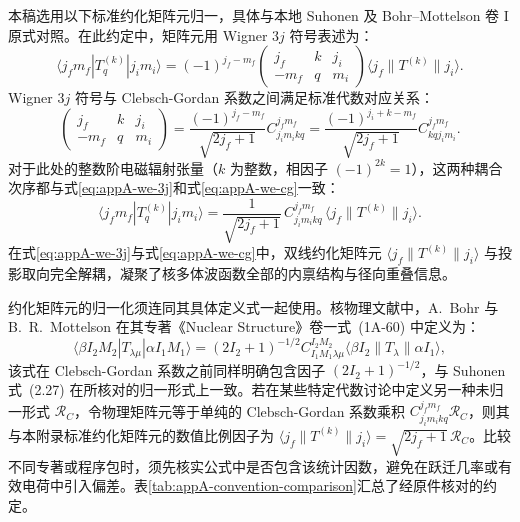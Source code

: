 本稿选用以下标准约化矩阵元归一，具体与本地 Suhonen 及 Bohr--Mottelson 卷 I 原式对照。在此约定中，矩阵元用 Wigner $3j$ 符号表述为：
\begin{equation}\label{eq:appA-we-3j}
\langle j_f m_f | T_q^{(k)} | j_i m_i \rangle = (-1)^{j_f - m_f} \begin{pmatrix} j_f & k & j_i \\ -m_f & q & m_i \end{pmatrix} \langle j_f \| T^{(k)} \| j_i \rangle .
\end{equation}
Wigner $3j$ 符号与 Clebsch-Gordan 系数之间满足标准代数对应关系：
\begin{equation}\label{eq:appA-3j-cg-relation}
\begin{pmatrix} j_f & k & j_i \\ -m_f & q & m_i \end{pmatrix} = \frac{(-1)^{j_f - m_f}}{\sqrt{2j_f + 1}} C_{j_i m_i k q}^{j_f m_f} = \frac{(-1)^{j_i + k - m_f}}{\sqrt{2j_f + 1}} C_{k q j_i m_i}^{j_f m_f} .
\end{equation}
对于此处的整数阶电磁辐射张量（$k$ 为整数，相因子 $(-1)^{2k} = 1$），这两种耦合次序都与式\eqref{eq:appA-we-3j}和式\eqref{eq:appA-we-cg}一致：
\begin{equation}\label{eq:appA-we-cg}
\langle j_f m_f | T_q^{(k)} | j_i m_i \rangle = \frac{1}{\sqrt{2j_f + 1}} \, C_{j_i m_i k q}^{j_f m_f} \, \langle j_f \| T^{(k)} \| j_i \rangle .
\end{equation}
在式\eqref{eq:appA-we-3j}与式\eqref{eq:appA-we-cg}中，双线约化矩阵元 $\langle j_f \| T^{(k)} \| j_i \rangle$ 与投影取向完全解耦，凝聚了核多体波函数全部的内禀结构与径向重叠信息。

约化矩阵元的归一化须连同其具体定义式一起使用。核物理文献中，A.~Bohr 与 B.~R.~Mottelson 在其专著《Nuclear Structure》卷一式~(1A-60) 中定义为：
\begin{equation}\label{eq:appA-we-bm}
\langle \beta I_2 M_2 | T_{\lambda\mu} | \alpha I_1 M_1 \rangle = (2I_2 + 1)^{-1/2} C_{I_1 M_1 \lambda \mu}^{I_2 M_2} \langle \beta I_2 \| T_\lambda \| \alpha I_1 \rangle ,
\end{equation}
该式在 Clebsch-Gordan 系数之前同样明确包含因子 $(2I_2 + 1)^{-1/2}$，与 Suhonen 式~(2.27) 在所核对的归一形式上一致。若在某些特定代数讨论中定义另一种未归一形式 $\mathcal{R}_C$，令物理矩阵元等于单纯的 Clebsch-Gordan 系数乘积 $C_{j_i m_i k q}^{j_f m_f} \mathcal{R}_C$，则其与本附录标准约化矩阵元的数值比例因子为 $\langle j_f \| T^{(k)} \| j_i \rangle = \sqrt{2j_f + 1}\,\mathcal{R}_C$。比较不同专著或程序包时，须先核实公式中是否包含该统计因数，避免在跃迁几率或有效电荷中引入偏差。表\ref{tab:appA-convention-comparison}汇总了经原件核对的约定。

